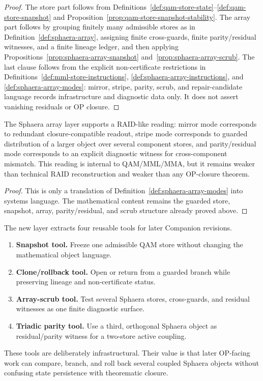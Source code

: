 \begin{proof}
The store part follows from Definitions~\ref{def:qam-store-state}--\ref{def:qam-store-snapshot} and Proposition~\ref{prop:qam-store-snapshot-stability}. The array part follows by grouping finitely many admissible stores as in Definition~\ref{def:sphaera-array}, assigning finite cross-guards, finite parity/residual witnesses, and a finite lineage ledger, and then applying Propositions~\ref{prop:sphaera-array-snapshot} and~\ref{prop:sphaera-array-scrub}. The last clause follows from the explicit non-certificate restrictions in Definitions~\ref{def:mml-store-instructions}, \ref{def:sphaera-array-instructions}, and \ref{def:sphaera-array-modes}: mirror, stripe, parity, scrub, and repair-candidate language records infrastructure and diagnostic data only. It does not assert vanishing residuals or OP closure.
\end{proof}

\begin{corollary}\label{cor:sphaera-array-raid-reading}
The Sphaera array layer supports a RAID-like reading: mirror mode corresponds to redundant closure-compatible readout, stripe mode corresponds to guarded distribution of a larger object over several component stores, and parity/residual mode corresponds to an explicit diagnostic witness for cross-component mismatch. This reading is internal to QAM/MML/MMA, but it remains weaker than technical RAID reconstruction and weaker than any OP-closure theorem.
\end{corollary}

\begin{proof}
This is only a translation of Definition~\ref{def:sphaera-array-modes} into systems language. The mathematical content remains the guarded store, snapshot, array, parity/residual, and scrub structure already proved above.
\end{proof}

\begin{remark}\label{rem:sphaera-array-tool-extraction}
The new layer extracts four reusable tools for later Companion revisions.
\begin{enumerate}[leftmargin=2em]
  \item \textbf{Snapshot tool.} Freeze one admissible QAM store without changing the mathematical object language.
  \item \textbf{Clone/rollback tool.} Open or return from a guarded branch while preserving lineage and non-certificate status.
  \item \textbf{Array-scrub tool.} Test several Sphaera stores, cross-guards, and residual witnesses as one finite diagnostic surface.
  \item \textbf{Triadic parity tool.} Use a third, orthogonal Sphaera object as residual/parity witness for a two-store active coupling.
\end{enumerate}
These tools are deliberately infrastructural. Their value is that later OP-facing work can compare, branch, and roll back several coupled Sphaera objects without confusing state persistence with theorematic closure.
\end{remark}

